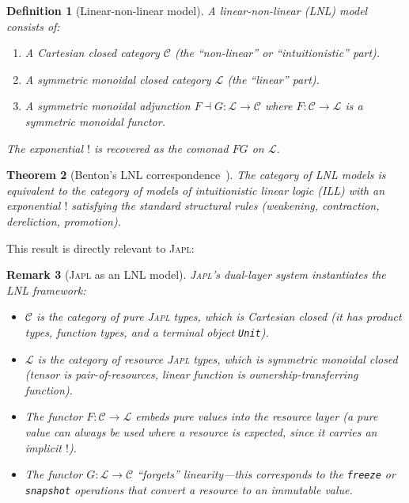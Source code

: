 \documentclass[11pt]{article}
\newtheorem{theorem}{Theorem}[section]
\newtheorem{definition}[theorem]{Definition}
\newtheorem{remark}[theorem]{Remark}
\newcommand{\JAPL}{\textsc{Japl}}
\newcommand{\bang}{{\mathop{!}}}
\begin{document}
\begin{definition}[Linear-non-linear model]\label{def:lnl}
A \emph{linear-non-linear (LNL) model}~\cite{benton1995mixed} consists
of:
\begin{enumerate}[label=(\roman*)]
  \item A Cartesian closed category $\mathcal{C}$ (the ``non-linear'' or ``intuitionistic'' part).
  \item A symmetric monoidal closed category $\mathcal{L}$ (the ``linear'' part).
  \item A symmetric monoidal adjunction $F \dashv G : \mathcal{L}
        \to \mathcal{C}$ where $F : \mathcal{C} \to \mathcal{L}$
        is a symmetric monoidal functor.
\end{enumerate}
The exponential $\bang$ is recovered as the comonad $FG$ on $\mathcal{L}$.
\end{definition}

\begin{theorem}[Benton's LNL correspondence~\cite{benton1995mixed}]\label{thm:lnl}
The category of LNL models is equivalent to the category of models
of intuitionistic linear logic (ILL) with an exponential $\bang$
satisfying the standard structural rules (weakening, contraction,
dereliction, promotion).
\end{theorem}

This result is directly relevant to \JAPL{}:

\begin{remark}[\JAPL{} as an LNL model]\label{rem:japl-lnl}
\JAPL{}'s dual-layer system instantiates the LNL framework:
\begin{itemize}
  \item $\mathcal{C}$ is the category of pure \JAPL{} types, which is
        Cartesian closed (it has product types, function types, and
        a terminal object \texttt{Unit}).
  \item $\mathcal{L}$ is the category of resource \JAPL{} types, which
        is symmetric monoidal closed (tensor is pair-of-resources,
        linear function is ownership-transferring function).
  \item The functor $F : \mathcal{C} \to \mathcal{L}$ embeds pure
        values into the resource layer (a pure value can always be
        used where a resource is expected, since it carries an
        implicit $\bang$).
  \item The functor $G : \mathcal{L} \to \mathcal{C}$ ``forgets''
        linearity---this corresponds to the \texttt{freeze} or
        \texttt{snapshot} operations that convert a resource to an
        immutable value.
\end{itemize}
\end{remark}
\end{document}
